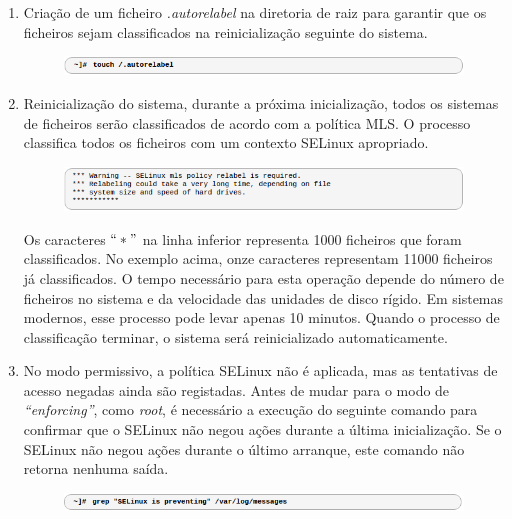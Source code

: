 \documentclass[../tp2.tex]{subfiles}
\begin{document}
\begin{enumerate}
\item Criação de um ficheiro \textit{.autorelabel} na diretoria de raiz para garantir que os ficheiros sejam classificados na reinicialização seguinte do sistema.\par
\begin{figure}[H]
\centering
\captionsetup{justification=centering,margin=2cm}
\centerline{\includegraphics[scale=0.7]{../imagens/auto.png}}
\end{figure}

\item Reinicialização  do sistema, durante a próxima inicialização, todos os sistemas de ficheiros serão classificados de acordo com a política MLS. O processo classifica todos os ficheiros com um contexto SELinux apropriado.\par
\begin{figure}[H]
\centering
\captionsetup{justification=centering,margin=2cm}
\centerline{\includegraphics[scale=0.7]{../imagens/reclassificacao.png}}
\end{figure}
Os caracteres $``*"$ na linha inferior representa 1000 ficheiros que foram classificados. No exemplo acima, onze caracteres representam 11000 ficheiros já classificados. O tempo necessário para esta operação depende do número de ficheiros no sistema e da velocidade das unidades de disco rígido. Em sistemas modernos, esse processo pode levar apenas 10 minutos. Quando o processo de classificação terminar, o sistema será reinicializado automaticamente.\par

\item No modo permissivo, a política SELinux não é aplicada, mas as tentativas de acesso negadas ainda são registadas. Antes de mudar para o modo de \textit{``enforcing''}, como \textit{root}, é necessário a execução do seguinte comando para confirmar que o SELinux não negou ações durante a última inicialização. Se o SELinux não negou ações durante o último arranque, este comando não retorna nenhuma saída.\par
\begin{figure}[H]
\centering
\captionsetup{justification=centering,margin=2cm}
\centerline{\includegraphics[scale=0.7]{../imagens/iniciar.png}}
\end{figure}


\end{enumerate}
\end{document}

